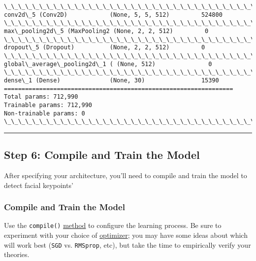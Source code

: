 \documentclass[11pt]{article}
\begin{document}
\begin{Verbatim}[commandchars=\\\{\}]
\_\_\_\_\_\_\_\_\_\_\_\_\_\_\_\_\_\_\_\_\_\_\_\_\_\_\_\_\_\_\_\_\_\_\_\_\_\_\_\_\_\_\_\_\_\_\_\_\_\_\_\_\_\_\_\_\_\_\_\_\_\_\_\_\_
conv2d\_5 (Conv2D)            (None, 5, 5, 512)         524800    
\_\_\_\_\_\_\_\_\_\_\_\_\_\_\_\_\_\_\_\_\_\_\_\_\_\_\_\_\_\_\_\_\_\_\_\_\_\_\_\_\_\_\_\_\_\_\_\_\_\_\_\_\_\_\_\_\_\_\_\_\_\_\_\_\_
max\_pooling2d\_5 (MaxPooling2 (None, 2, 2, 512)         0         
\_\_\_\_\_\_\_\_\_\_\_\_\_\_\_\_\_\_\_\_\_\_\_\_\_\_\_\_\_\_\_\_\_\_\_\_\_\_\_\_\_\_\_\_\_\_\_\_\_\_\_\_\_\_\_\_\_\_\_\_\_\_\_\_\_
dropout\_5 (Dropout)          (None, 2, 2, 512)         0         
\_\_\_\_\_\_\_\_\_\_\_\_\_\_\_\_\_\_\_\_\_\_\_\_\_\_\_\_\_\_\_\_\_\_\_\_\_\_\_\_\_\_\_\_\_\_\_\_\_\_\_\_\_\_\_\_\_\_\_\_\_\_\_\_\_
global\_average\_pooling2d\_1 ( (None, 512)               0         
\_\_\_\_\_\_\_\_\_\_\_\_\_\_\_\_\_\_\_\_\_\_\_\_\_\_\_\_\_\_\_\_\_\_\_\_\_\_\_\_\_\_\_\_\_\_\_\_\_\_\_\_\_\_\_\_\_\_\_\_\_\_\_\_\_
dense\_1 (Dense)              (None, 30)                15390     
=================================================================
Total params: 712,990
Trainable params: 712,990
Non-trainable params: 0
\_\_\_\_\_\_\_\_\_\_\_\_\_\_\_\_\_\_\_\_\_\_\_\_\_\_\_\_\_\_\_\_\_\_\_\_\_\_\_\_\_\_\_\_\_\_\_\_\_\_\_\_\_\_\_\_\_\_\_\_\_\_\_\_\_

    \end{Verbatim}

    \begin{center}\rule{0.5\linewidth}{\linethickness}\end{center}

\subsection{Step 6: Compile and Train the
Model}\label{step-6-compile-and-train-the-model}

After specifying your architecture, you'll need to compile and train the
model to detect facial keypoints'

    \subsubsection{Compile and Train the
Model}\label{compile-and-train-the-model}

Use the \texttt{compile()}
\href{https://keras.io/models/sequential/\#sequential-model-methods}{method}
to configure the learning process. Be sure to experiment with your
choice of \href{https://keras.io/optimizers/}{optimizer}; you may have
some ideas about which will work best (\texttt{SGD} vs.
\texttt{RMSprop}, etc), but take the time to empirically verify your
theories.
\end{document}
